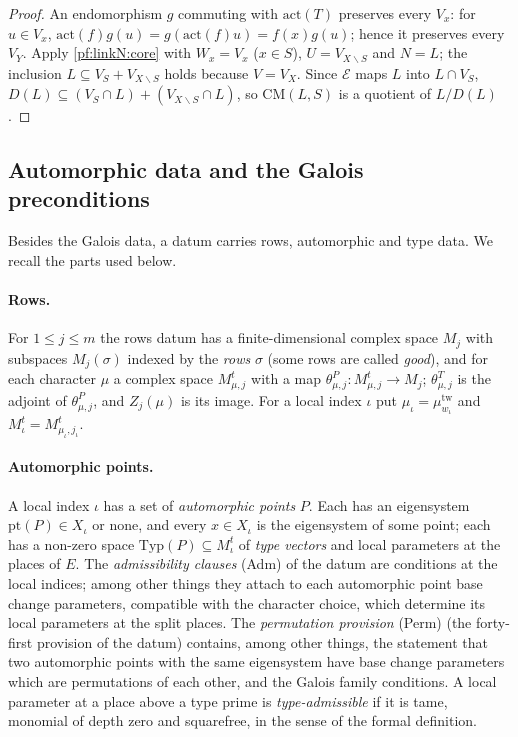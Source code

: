 \begin{proof}
An endomorphism $g$ commuting with $\mathrm{act}(T)$ preserves every $V_x$: for $u\in V_x$, $\mathrm{act}(f)g(u)=g(\mathrm{act}(f)u)=f(x)g(u)$;
hence it preserves every $V_Y$. Apply \cref{pf:linkN:core} with $W_x=V_x$ ($x\in S$), $U=V_{X\smallsetminus S}$ and $N=L$; the inclusion
$L\subseteq V_S+V_{X\smallsetminus S}$ holds because $V=V_X$. Since $\mathcal E$ maps $L$ into $L\cap V_S$, $D(L)\subseteq(V_S\cap L)+(V_{X\smallsetminus S}\cap L)$,
so $\mathrm{CM}(L,S)$ is a quotient of $L/D(L)$.
\end{proof}

\subsection{Automorphic data and the Galois preconditions}\label{sec:pf:linkN:gp}

Besides the Galois data, a datum carries rows, automorphic and type data. We recall the parts used below.

\paragraph{Rows.}
For $1\le j\le m$ the rows datum has a finite-dimensional complex space $M_j$ with subspaces $M_j(\sigma)$ indexed by the
\emph{rows} $\sigma$ (some rows are called \emph{good}), and for each character $\mu$ a complex space $M^t_{\mu,j}$ with a map
$\theta^P_{\mu,j}:M^t_{\mu,j}\to M_j$; $\theta^T_{\mu,j}$ is the adjoint of $\theta^P_{\mu,j}$, and $Z_j(\mu)$ is its image. For a
local index $\iota$ put $\mu_\iota=\mu^{\mathrm{tw}}_{w_\iota}$ and $M^t_\iota=M^t_{\mu_\iota,j_\iota}$.

\paragraph{Automorphic points.}
A local index $\iota$ has a set of \emph{automorphic points} $P$. Each has an eigensystem $\mathrm{pt}(P)\in X_\iota$ or none, and
every $x\in X_\iota$ is the eigensystem of some point; each has a non-zero space $\mathrm{Typ}(P)\subseteq M^t_\iota$ of \emph{type
vectors} and local parameters at the places of $E$. The \emph{admissibility clauses} (Adm) of the datum are conditions at the
local indices; among other things they attach to each automorphic point base change parameters, compatible with the character
choice, which determine its local parameters at the split places. The \emph{permutation provision} (Perm) (the forty-first
provision of the datum) contains, among other things, the statement that two automorphic points with the same eigensystem
have base change parameters which are permutations of each other, and the Galois family conditions. A local
parameter at a place above a type prime is \emph{type-admissible} if it is tame, monomial of depth zero and squarefree, in the
sense of the formal definition.

